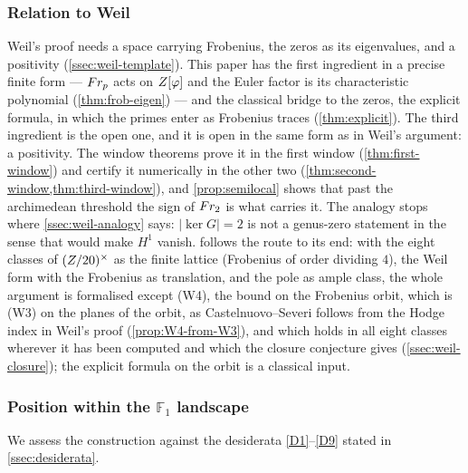 \subsubsection{Relation to Weil}\label{ssec:rel-weil}

Weil's proof needs a space carrying Frobenius, the zeros as its eigenvalues, and
a positivity (\cref{ssec:weil-template}).  This paper has the first ingredient in
a precise finite form --- $Fr_p$ acts on $Z[\varphi]$ and the Euler factor is its
characteristic polynomial (\cref{thm:frob-eigen}) --- and the classical bridge to
the zeros, the explicit formula, in which the primes enter as Frobenius traces
(\cref{thm:explicit}).  The third ingredient is the open one, and it is open in
the same form as in Weil's argument: a positivity.  The window theorems prove it in the first window (\cref{thm:first-window}) and certify it numerically in the other two (\cref{thm:second-window,thm:third-window}), and \cref{prop:semilocal} shows that past the archimedean
threshold the sign of $Fr_2$ is what carries it.  The analogy stops where
\cref{ssec:weil-analogy} says: $|\ker G|=2$ is not a genus-zero statement in the
sense that would make $H^1$ vanish.   follows the route to its end:
with the eight classes of $(Z/20)^\times$ as the finite lattice (Frobenius of order dividing $4$),
the Weil form with the Frobenius as translation, and the pole as ample class, the whole argument
is formalised except (W4), the bound on the Frobenius orbit, which is (W3) on the planes of the orbit, as Castelnuovo--Severi follows from the Hodge index in Weil's proof (\cref{prop:W4-from-W3}), and which holds in all eight classes
wherever it has been computed and which the closure conjecture gives (\cref{ssec:weil-closure}); the
explicit formula on the orbit is a classical input.

\subsubsection{Position within the $\mathbb{F}_1$ landscape}
\label{ssec:position}

We assess the construction against the desiderata
\ref{D1}--\ref{D9} stated in \cref{ssec:desiderata}.

